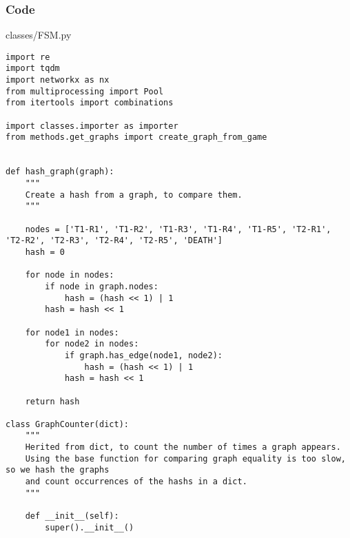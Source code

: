 \documentclass{beamer}
\begin{document}
\begin{frame}[fragile]
    \frametitle{Code}
    \scriptsize
    classes/FSM.py \newline
    \fontsize{3pt}{5pt}\selectfont
    \begin{verbatim}
import re
import tqdm
import networkx as nx
from multiprocessing import Pool
from itertools import combinations

import classes.importer as importer
from methods.get_graphs import create_graph_from_game


def hash_graph(graph):
    """
    Create a hash from a graph, to compare them.
    """
    
    nodes = ['T1-R1', 'T1-R2', 'T1-R3', 'T1-R4', 'T1-R5', 'T2-R1', 'T2-R2', 'T2-R3', 'T2-R4', 'T2-R5', 'DEATH']
    hash = 0

    for node in nodes:
        if node in graph.nodes:
            hash = (hash << 1) | 1
        hash = hash << 1

    for node1 in nodes:
        for node2 in nodes:
            if graph.has_edge(node1, node2):
                hash = (hash << 1) | 1
            hash = hash << 1
    
    return hash

class GraphCounter(dict):
    """
    Herited from dict, to count the number of times a graph appears.
    Using the base function for comparing graph equality is too slow, so we hash the graphs
    and count occurrences of the hashs in a dict.
    """
    
    def __init__(self):
        super().__init__()
    \end{verbatim}
\end{frame}
\end{document}
